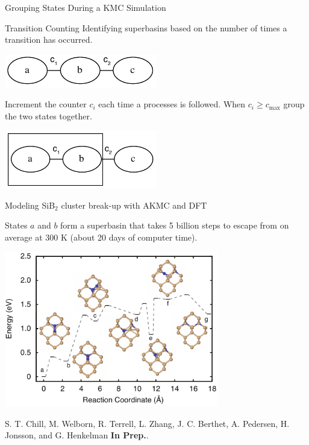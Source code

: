 \documentclass[onlymath]{beamer}
\begin{document}
\begin{frame}{Grouping States During a KMC Simulation}

  \begin{block}{Transition Counting}
    Identifying superbasins based on the number of times a transition has
    occurred.
  \end{block}

  \begin{center}
    \includegraphics[width=0.5\textwidth]{images/tc.pdf}
  \end{center}

  Increment the counter $c_i$ each time a processes is followed. When
  $c_i \geq c_\mathrm{max}$ group the two states together.

  \begin{center}
    \includegraphics[width=0.5\textwidth]{images/tc2.pdf}
  \end{center}

\end{frame}

\begin{frame}{Modeling SiB$_2$ cluster break-up with AKMC and DFT}

States $a$ and $b$ form a superbasin that takes 5 billion steps to escape from on average at 300 K (about 20 days of computer time).

  \begin{center}
    \includegraphics[width=0.7\textwidth]{images/sib2i-pes}
  \end{center}
  \vspace{-2mm}
  {\tiny S. T. Chill,  M. Welborn, R. Terrell, L. Zhang, J. C. Berthet, A. Pedersen, H. Jonsson, and G. Henkelman \textbf{In Prep.}.}
\end{frame}
\end{document}
